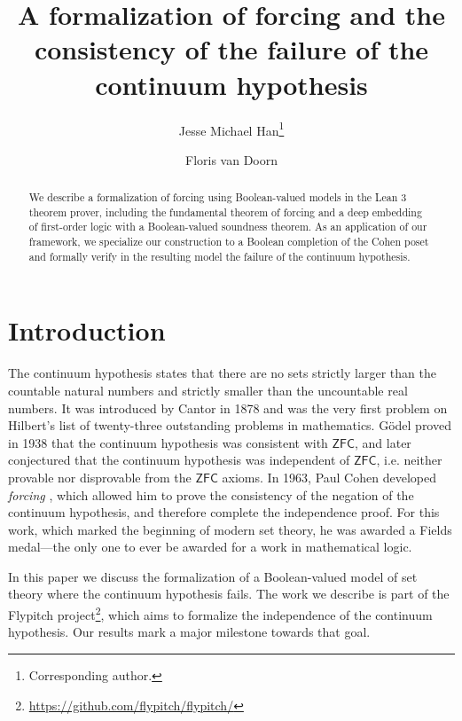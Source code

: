\documentclass[a4paper,USenglish,cleveref, autoref]{lipics-v2019}
\title{A formalization of forcing and the consistency of the failure of the continuum hypothesis} %
\author{Jesse Michael Han\footnote{Corresponding author.}}{Department of Mathematics, University of Pittsburgh \and \url{https://www.pitt.edu/~jmh288}}{jessemichaelhan@gmail.com}{}{}%
\author{Floris van Doorn}{Department of Mathematics, University of Pittsburgh \and \url{http://florisvandoorn.com/}}{fpvdoorn@gmail.com}{}{}
\theoremstyle{definition}
\begin{document}
\maketitle

\begin{abstract}
We describe a formalization of forcing using Boolean-valued models in the Lean 3 theorem prover, including the fundamental theorem of forcing and a deep embedding of first-order logic with a Boolean-valued soundness theorem. As an application of our framework, we specialize our construction to a Boolean completion of the Cohen poset and formally verify in the resulting model the failure of the continuum hypothesis.
\end{abstract}

\section*{Introduction}
The continuum hypothesis states that there are no sets strictly larger than the countable natural numbers and strictly smaller than the uncountable real numbers. It was introduced by Cantor in 1878 \cite{cantor1878continuumhypothesis} and was the very first problem on Hilbert's list of twenty-three outstanding problems in mathematics. G\"odel proved in 1938 \cite{godel1938consistency} that the continuum hypothesis was consistent with $\mathsf{ZFC}$, and later conjectured that the continuum hypothesis was independent of $\mathsf{ZFC}$, i.e. neither provable nor disprovable from the $\mathsf{ZFC}$ axioms. In 1963, Paul Cohen developed \emph{forcing} \cite{cohen-the-independence-of-the-continuum-hypothesis-1}, which allowed him to prove the consistency of the negation of the continuum hypothesis, and therefore complete the independence proof. For this work, which marked the beginning of modern set theory, he was awarded a Fields medal---the only one to ever be awarded for a work in mathematical logic.

In this paper we discuss the formalization of a Boolean-valued model of set theory where the continuum hypothesis fails. %
The work we describe is part of the Flypitch project\footnote{\url{https://github.com/flypitch/flypitch/}}, which aims to formalize the independence of the continuum hypothesis. Our results mark a major milestone towards that goal.
\end{document}
